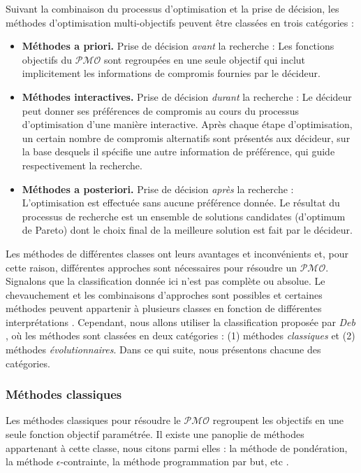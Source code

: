 Suivant la combinaison du processus d'optimisation et la prise de décision, les méthodes d'optimisation multi-objectifs peuvent être classées en trois catégories \cite{Hwang79,Marler04,Collette13} :
\begin{itemize}
 \item \textbf{Méthodes a priori.} Prise de décision \textit{avant} la recherche : Les fonctions objectifs du $\mathcal{PMO}$ sont regroupées en une seule objectif qui inclut implicitement les informations de compromis fournies par le décideur.
 \item \textbf{Méthodes interactives.} Prise de décision \textit{durant} la recherche : Le décideur peut donner ses préférences de compromis au cours du processus d'optimisation d'une manière interactive. Après chaque étape d'optimisation, un certain nombre de compromis alternatifs sont présentés aux décideur, sur la base desquels il spécifie une autre information de préférence, qui guide respectivement la recherche.
 \item \textbf{Méthodes a posteriori.} Prise de décision \textit{après} la recherche : L'optimisation est effectuée sans aucune préférence donnée. Le résultat du processus de recherche est un ensemble de solutions candidates (d'optimum de Pareto) dont le choix final de la meilleure solution est fait par le décideur.
\end{itemize}

Les méthodes de différentes classes ont leurs avantages et inconvénients et, pour cette raison, différentes approches sont nécessaires pour résoudre un $\mathcal{PMO}$. Signalons que la classification donnée ici n'est pas complète ou absolue. Le chevauchement et les combinaisons d'approches sont possibles et certaines méthodes peuvent appartenir à plusieurs classes en fonction de différentes interprétations \cite{Branke08}. Cependant, nous allons utiliser la classification proposée par \textit{Deb} \cite{Deb01}, où les méthodes sont classées en deux catégories : (1) méthodes \textit{classiques} et (2) méthodes \textit{évolutionnaires}. Dans ce qui suite, nous présentons chacune des catégories.

\subsubsection{Méthodes classiques}
Les méthodes classiques pour résoudre le $\mathcal{PMO}$ regroupent les objectifs en une seule fonction objectif paramétrée. Il existe une panoplie de méthodes appartenant à cette classe, nous citons parmi elles : la méthode de pondération, la méthode $\epsilon$-contrainte, la méthode programmation par but, etc \cite{Collette13,Branke08,Deb01}.

